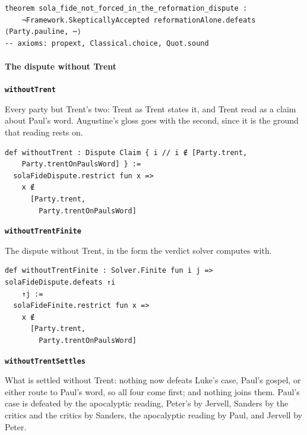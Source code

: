 \documentclass[11pt]{article}
\begin{document}
{\small\begin{verbatim}
theorem sola_fide_not_forced_in_the_reformation_dispute :
    ¬Framework.SkepticallyAccepted reformationAlone.defeats ⟨Party.pauline, ⋯⟩
-- axioms: propext, Classical.choice, Quot.sound
\end{verbatim}}
\paragraph*{The dispute without Trent}
\leavevmode\par
\par\medskip\noindent\textbf{\texttt{without\allowbreak{}Trent}}\par\nobreak\noindent
Every party but Trent's two: Trent as Trent states it, and Trent read as a claim about Paul's word. Augustine's gloss goes with the second, since it is the ground that reading rests on.

{\small\begin{verbatim}
def withoutTrent : Dispute Claim { i // i ∉ [Party.trent,
    Party.trentOnPaulsWord] } :=
  solaFideDispute.restrict fun x =>
    x ∉
      [Party.trent,
        Party.trentOnPaulsWord]
\end{verbatim}}
\par\medskip\noindent\textbf{\texttt{without\allowbreak{}Trent\allowbreak{}Finite}}\par\nobreak\noindent
The dispute without Trent, in the form the verdict solver computes with.

{\small\begin{verbatim}
def withoutTrentFinite : Solver.Finite fun i j => solaFideDispute.defeats ↑i
    ↑j :=
  solaFideFinite.restrict fun x =>
    x ∉
      [Party.trent,
        Party.trentOnPaulsWord]
\end{verbatim}}
\par\medskip\noindent\textbf{\texttt{without\allowbreak{}Trent\allowbreak{}Settles}}\par\nobreak\noindent
What is settled without Trent: nothing now defeats Luke's case, Paul's gospel, or either route to Paul's word, so all four come first; and nothing joins them. Paul's case is defeated by the apocalyptic reading, Peter's by Jervell, Sanders by the critics and the critics by Sanders, the apocalyptic reading by Paul, and Jervell by Peter.
\end{document}

